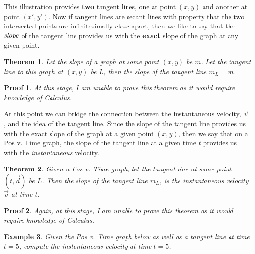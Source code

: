 \documentclass[12pt]{article}
\newcommand{\tx}[1]{\text{#1}}
\theoremstyle{break}
\newtheorem{thm}{Theorem}[subsection]
\newtheorem{ex}[thm]{Example}
\newtheorem*{pf}{Proof}
\begin{document}
This illustration provides \textbf{two} tangent lines, one at point $(x,y)$ and another at point $(x',y')$. Now if tangent lines are secant lines with property that the two intersected points are infinitesimally close apart, then we like to say that the $\emph{slope}$ of the tangent line provides us with the \textbf{exact} slope of the graph at any given point.

\begin{thm}
	Let the slope of a graph at some point $(x,y)$ be $m$. Let the tangent line to this graph at $(x,y)$ be $L$, then the slope of the tangent line $m_L = m$.
\end{thm}
\begin{pf}
At this stage, I am unable to prove this theorem as it would require knowledge of Calculus.
\end{pf}
At this point we can bridge the connection between the instantaneous velocity, $\vec v$ , and the idea of the tangent line. Since the slope of the tangent line provides us with the exact slope of the graph at a given point $(x,y)$, then we say that on a Pos v. Time graph, the slope of the tangent line at a given time $t$ provides us with the \emph{instantaneous} velocity. 
\begin{thm}
Given a Pos v. Time graph, let the tangent line at some point $(t, \vec d)$ be $L$. Then the slope of the tangent line $m_L$, is the instantaneous velocity $\vec v$ at time $t$.
\end{thm}
\begin{pf}
Again, at this stage, I am unable to prove this theorem as it would require knowledge of Calculus.
\end{pf}
\begin{ex}
Given the Pos v. Time graph below as well as a tangent line at time $t = 5$, compute the instantaneous velocity at time $t = 5$.
\begin{center}
\end{center}
\end{ex}
\end{document}
